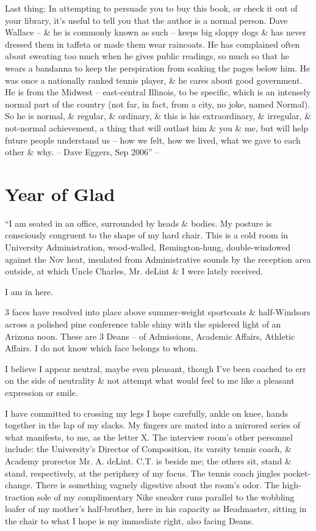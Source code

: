 \documentclass{article}
\numberwithin{equation}{section}
\begin{document}
Last thing: In attempting to persuade you to buy this book, or check it out of your library, it's useful to tell you that the author is a normal person. Dave Wallace -- \& he is commonly known as such -- keeps big sloppy dogs \& has never dressed them in taffeta or made them wear raincoats. He has complained often about sweating too much when he gives public readings, so much so that he wears a bandanna to keep the perspiration from soaking the pages below him. He was once a nationally ranked tennis player, \& he cares about good government. He is from the Midwest -- east-central Illinois, to be specific, which is an intensely normal part of the country (not far, in fact, from a city, no joke, named Normal). So he is normal, \& regular, \& ordinary, \& this is his extraordinary, \& irregular, \& not-normal achievement, a thing that will outlast him \& you \& me, but will help future people understand us -- how we felt, how we lived, what we gave to each other \& why. -- Dave Eggers, Sep 2006'' -- \cite[pp. xi--xvi]{Wallace2011}


\section{Year of Glad}
``I am seated in an office, surrounded by heads \& bodies. My posture is consciously congruent to the shape of my hard chair. This is a cold room in University Administration, wood-walled, Remington-hung, double-windowed against the Nov heat, insulated from Administrative sounds by the reception area outside, at which Uncle Charles, Mr. deLint \& I were lately received.

I am in here.

3 faces have resolved into place above summer-weight sportcoats \& half-Windsors across a polished pine conference table shiny with the spidered light of an Arizona noon. These are 3 Deans -- of Admissions, Academic Affairs, Athletic Affairs. I do not know which face belongs to whom.

I believe I appear neutral, maybe even pleasant, though I've been coached to err on the side of neutrality \& not attempt what would feel to me like a pleasant expression or smile.

I have committed to crossing my legs I hope carefully, ankle on knee, hands together in the lap of my slacks. My fingers are mated into a mirrored series of what manifests, to me, as the letter X. The interview room's other personnel include: the University's Director of Composition, its varsity tennis coach, \& Academy prorector Mr. A. deLint. C.T. is beside me; the others sit, stand \& stand, respectively, at the periphery of my focus. The tennis coach jingles pocket-change. There is something vaguely digestive about the room's odor. The high-traction sole of my complimentary Nike sneaker runs parallel to the wobbling loafer of my mother's half-brother, here in his capacity as Headmaster, sitting in the chair to what I hope is my immediate right, also facing Deans.
\end{document}
